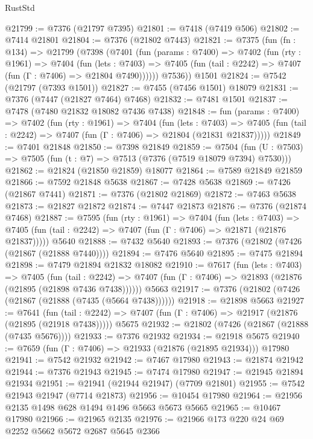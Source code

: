 \begin{lexlean}{RustStd}
\begin{coremodule}
@21799 := @7376 (@21797 @7395)
@21801 := @7418 (@7419 @506)
@21802 := @7414 @21801
@21804 := @7376 (@21802 @7443)
@21821 := @7375
    (fun (fn : @134) =>
    @21799
      (@7398
        (@7401
          (fun (params : @7400) =>
          @7402
            (fun (rty : @1961) =>
            @7404
              (fun (lets : @7403) =>
              @7405 (fun (tail : @2242) => @7407 (fun (Γ : @7406) => @21804 @7490))))))
        @7536))
    @1501
@21824 := @7542 (@21797 (@7393 @1501))
@21827 := @7455 (@7456 @1501) @18079
@21831 := @7376 (@7447 (@21827 @7464) @7468)
@21832 := @7481 @1501
@21837 := @7478 (@7480 @21832 @18082 @7436 @7438)
@21848 := fun (params : @7400) =>
  @7402
    (fun (rty : @1961) =>
    @7404
      (fun (lets : @7403) =>
      @7405 (fun (tail : @2242) => @7407 (fun (Γ : @7406) => @21804 (@21831 @21837)))))
@21849 := @7401 @21848
@21850 := @7398 @21849
@21859 := @7504
    (fun (U : @7503) => @7505 (fun (t : @7) => @7513 (@7376 (@7519 @18079 @7394) @7530)))
@21862 := @21824 (@21850 @21859) @18077
@21864 := @7589 @21849 @21859
@21866 := @7592 @21848 @5638
@21867 := @7428 @5638
@21869 := @7426 (@21867 @7441)
@21871 := @7376 (@21802 @21869)
@21872 := @7463 @5638
@21873 := @21827 @21872
@21874 := @7447 @21873
@21876 := @7376 (@21874 @7468)
@21887 := @7595
    (fun (rty : @1961) =>
    @7404
      (fun (lets : @7403) =>
      @7405 (fun (tail : @2242) => @7407 (fun (Γ : @7406) => @21871 (@21876 @21837)))))
    @5640
@21888 := @7432 @5640
@21893 := @7376 (@21802 (@7426 (@21867 (@21888 @7440))))
@21894 := @7476 @5640
@21895 := @7475 @21894
@21898 := @7479 @21894 @21832 @18082
@21910 := @7617
    (fun (lets : @7403) =>
    @7405
      (fun (tail : @2242) =>
      @7407 (fun (Γ : @7406) => @21893 (@21876 (@21895 (@21898 @7436 @7438))))))
    @5663
@21917 := @7376 (@21802 (@7426 (@21867 (@21888 (@7435 (@5664 @7438))))))
@21918 := @21898 @5663
@21927 := @7641
    (fun (tail : @2242) => @7407 (fun (Γ : @7406) => @21917 (@21876 (@21895 (@21918 @7438)))))
    @5675
@21932 := @21802 (@7426 (@21867 (@21888 (@7435 @5676))))
@21933 := @7376 @21932
@21934 := @21918 @5675
@21940 := @7659 (fun (Γ : @7406) => @21933 (@21876 (@21895 @21934))) @17980
@21941 := @7542 @21932
@21942 := @7467 @17980
@21943 := @21874 @21942
@21944 := @7376 @21943
@21945 := @7474 @17980
@21947 := @21945 @21894 @21934
@21951 := @21941 (@21944 @21947) (@7709 @21801)
@21955 := @7542 @21943 @21947 (@7714 @21873)
@21956 := @10454 @17980
@21964 := @21956 @2135 @1498 @628 @1494 @1496 @5663 @5673 @5665
@21965 := @10467 @17980
@21966 := @21965 @2135
@21976 := @21966 @173 @220 @24 @69 @2252 @5662 @5672 @2687 @5645 @2366

\end{coremodule}
\end{lexlean}

